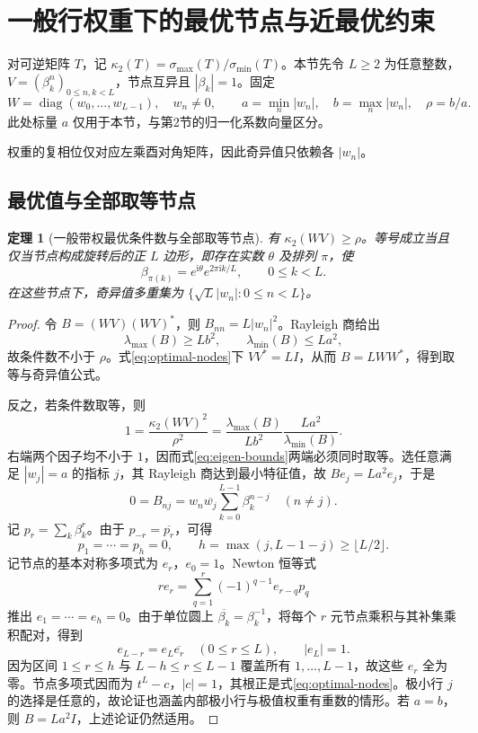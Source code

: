 \documentclass[UTF8,a4paper,zihao=-4,fontset=windows]{ctexart}
\theoremstyle{chinese}
\newtheorem{theorem}{定理}[section]
\numberwithin{equation}{section}
\newcommand{\diag}{\operatorname{diag}}
\newcommand{\cond}{\kappa_2}
\begin{document}
\section{一般行权重下的最优节点与近最优约束}
对可逆矩阵 $T$，记 $\cond(T)=\sigma_{\max}(T)/\sigma_{\min}(T)$。本节先令 $L\ge2$ 为任意整数，$V=(\beta_k^n)_{0\le n,k<L}$，节点互异且 $|\beta_k|=1$。固定
\[
W=\diag(w_0,\ldots,w_{L-1}),\quad w_n\ne0,\qquad
a=\min_n|w_n|,\quad b=\max_n|w_n|,\quad \rho=b/a.
\]
此处标量 $a$ 仅用于本节，与第2节的归一化系数向量区分。

权重的复相位仅对应左乘酉对角矩阵，因此奇异值只依赖各 $|w_n|$。

\subsection{最优值与全部取等节点}
\begin{theorem}[一般带权最优条件数与全部取等节点]\label{thm:weighted}
有 $\cond(WV)\ge\rho$。等号成立当且仅当节点构成旋转后的正 $L$ 边形，即存在实数 $\theta$ 及排列 $\pi$，使
\begin{equation}\label{eq:optimal-nodes}
\beta_{\pi(k)}=e^{\mathrm i\theta}e^{2\pi\mathrm ik/L},\qquad 0\le k<L.
\end{equation}
在这些节点下，奇异值多重集为 $\{\sqrt L|w_n|:0\le n<L\}$。
\end{theorem}
\begin{proof}
令 $B=(WV)(WV)^*$，则 $B_{nn}=L|w_n|^2$。Rayleigh 商给出
\begin{equation}\label{eq:eigen-bounds}
\lambda_{\max}(B)\ge Lb^2,\qquad \lambda_{\min}(B)\le La^2,
\end{equation}
故条件数不小于 $\rho$。式\eqref{eq:optimal-nodes}下 $VV^*=LI$，从而 $B=LWW^*$，得到取等与奇异值公式。

反之，若条件数取等，则
\[
1=\frac{\cond(WV)^2}{\rho^2}
=\frac{\lambda_{\max}(B)}{Lb^2}\frac{La^2}{\lambda_{\min}(B)}.
\]
右端两个因子均不小于 $1$，因而式\eqref{eq:eigen-bounds}两端必须同时取等。选任意满足 $|w_j|=a$ 的指标 $j$，其 Rayleigh 商达到最小特征值，故 $Be_j=La^2e_j$，于是
\[
0=B_{nj}=w_n\overline{w_j}\sum_{k=0}^{L-1}\beta_k^{n-j}\quad(n\ne j).
\]
记 $p_r=\sum_k\beta_k^r$。由于 $p_{-r}=\overline{p_r}$，可得
\[
p_1=\cdots=p_h=0,\qquad h=\max(j,L-1-j)\ge\lfloor L/2\rfloor.
\]
记节点的基本对称多项式为 $e_r$，$e_0=1$。Newton 恒等式
\[
r e_r=\sum_{q=1}^r(-1)^{q-1}e_{r-q}p_q
\]
推出 $e_1=\cdots=e_h=0$。由于单位圆上 $\overline{\beta_k}=\beta_k^{-1}$，将每个 $r$ 元节点乘积与其补集乘积配对，得到
\[
e_{L-r}=e_L\overline{e_r}\quad(0\le r\le L),\qquad |e_L|=1.
\]
因为区间 $1\le r\le h$ 与 $L-h\le r\le L-1$ 覆盖所有 $1,\ldots,L-1$，故这些 $e_r$ 全为零。节点多项式因而为 $t^L-c$，$|c|=1$，其根正是式\eqref{eq:optimal-nodes}。极小行 $j$ 的选择是任意的，故论证也涵盖内部极小行与极值权重有重数的情形。若 $a=b$，则 $B=La^2I$，上述论证仍然适用。
\end{proof}
\end{document}

